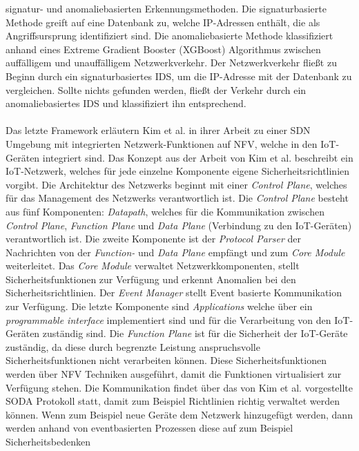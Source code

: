 signatur- und anomaliebasierten Erkennungsmethoden. Die signaturbasierte Methode greift auf eine Datenbank zu, welche IP-Adressen enthält, die als Angriffsursprung identifiziert sind. Die
anomaliebasierte Methode klassifiziert anhand eines Extreme Gradient Booster (XGBoost) Algorithmus \cite{DBLP:journals/corr/ChenG16} zwischen auffälligem und unauffälligem Netzwerkverkehr. Der
Netzwerkverkehr fließt zu Beginn durch ein signaturbasiertes IDS, um die IP-Adresse mit der Datenbank zu vergleichen. Sollte nichts gefunden werden, fließt der Verkehr durch ein anomaliebasiertes IDS
und klassifiziert ihn entsprechend. \\ \\ Das letzte Framework erläutern Kim et al. \cite{DBLP:journals/cn/KimNPSS19} in ihrer Arbeit zu einer SDN Umgebung mit integrierten Netzwerk-Funktionen auf
NFV, welche in den IoT-Geräten integriert sind. Das Konzept aus der Arbeit von Kim et al. beschreibt ein IoT-Netzwerk, welches für jede einzelne Komponente eigene Sicherheitsrichtlinien vorgibt. Die
Architektur des Netzwerks beginnt mit einer \textit{Control Plane}, welches für das Management des Netzwerks verantwortlich ist. Die \textit{Control Plane} besteht aus fünf Komponenten:
\textit{Datapath}, welches für die Kommunikation zwischen \textit{Control Plane}, \textit{Function Plane} und \textit{Data Plane} (Verbindung zu den IoT-Geräten) verantwortlich ist. Die zweite
Komponente ist der \textit{Protocol Parser} der Nachrichten von der \textit{Function-} und \textit{Data Plane} empfängt und zum \textit{Core Module} weiterleitet. Das \textit{Core Module} verwaltet
Netzwerkkomponenten, stellt Sicherheitsfunktionen zur Verfügung und erkennt Anomalien bei den Sicherheitsrichtlinien. Der \textit{Event Manager} stellt Event basierte Kommunikation zur
Verfügung. Die letzte Komponente sind \textit{Applications} welche über ein \textit{programmable interface} implementiert sind und für die Verarbeitung von den IoT-Geräten zuständig sind. Die
\textit{Function Plane} ist für die Sicherheit der IoT-Geräte zuständig, da diese durch begrenzte Leistung anspruchsvolle Sicherheitsfunktionen nicht verarbeiten können. Diese Sicherheitsfunktionen
werden über NFV Techniken ausgeführt, damit die Funktionen virtualisiert zur Verfügung stehen. Die Kommunikation findet über das von Kim et al. vorgestellte SODA Protokoll statt, damit zum Beispiel
Richtlinien richtig verwaltet werden können. Wenn zum Beispiel neue Geräte dem Netzwerk hinzugefügt werden, dann werden anhand von eventbasierten Prozessen diese auf zum Beispiel Sicherheitsbedenken

